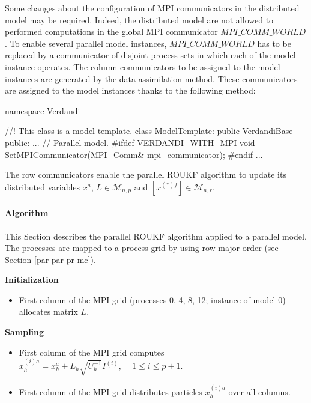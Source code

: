 Some changes  about the configuration of MPI communicators in the distributed model may be required. Indeed, the distributed model are not allowed to performed computations in the global MPI communicator $MPI\_COMM\_WORLD$. To enable several parallel model instances, $MPI\_COMM\_WORLD$ has to be replaced by a communicator of disjoint process sets in which each of the model instance operates. The column communicators to be assigned to the model instances are generated by the data assimilation method. These communicators are assigned to the model instances thanks to the following method:

\begin{frame_cpp}
namespace Verdandi
{


    //! This class is a model template.
    class ModelTemplate: public VerdandiBase
    {
        public:
            ...
            // Parallel model.
#ifdef VERDANDI_WITH_MPI
            void SetMPICommunicator(MPI_Comm& mpi_communicator);
#endif
            ...
    }

}
\end{frame_cpp}

The row communicators enable the parallel ROUKF algorithm to update its distributed variables $x^a$, $L \in \mathcal{M}_{n,p}$ and $ [x^{(*)f}] \in \mathcal{M}_{n,r}$.


\hypertarget{par-par-pr-a}{}\paragraph{Algorithm}\label{par-par-pr-a}

This Section describes the parallel ROUKF algorithm applied to a parallel model. The processes are mapped to a process grid by using row-major order (see Section \ref{par-par-pr-mc}).


\par \textbf{Initialization}

  \begin{itemize}

 \item First column  of the MPI grid (processes 0, 4, 8, 12; instance of model 0) allocates matrix $L$.\\

 \end{itemize}

 \par  \textbf{Sampling}


 \begin{itemize}

  \item First column  of the MPI grid computes  $ x_{h}^{(i)a} = x_h^a + L_h\sqrt{U_h^{-1}}I^{(i)} \textrm{, } \quad 1\leq i \leq p+1 $.

  \item First column  of the MPI grid distributes particles  $ x_{h}^{(i)a} $ over all columns.\\

 \end{itemize}

